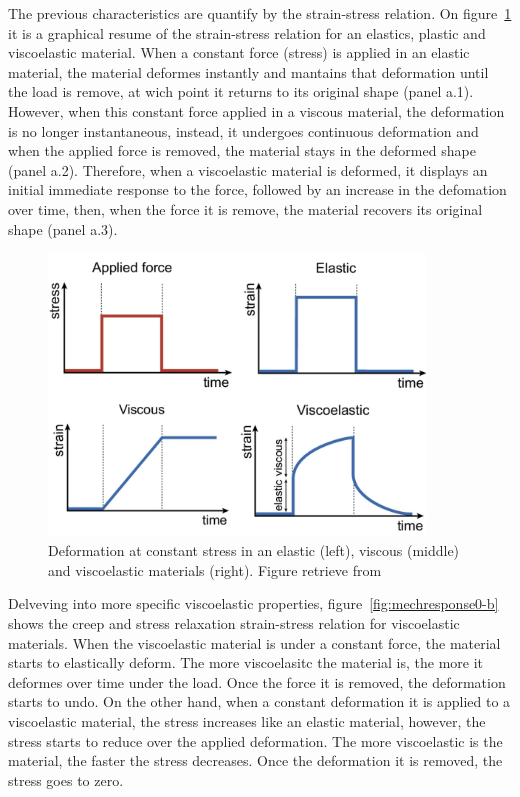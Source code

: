 The previous characteristics are quantify by the strain-stress relation.
On figure~\ref{fig:mechresponse0-a} it is a graphical resume of the strain-stress relation for an elastics, plastic and viscoelastic material.
When a constant force (stress) is applied in an elastic material, the material deformes instantly and mantains that deformation until the load is remove, at wich point it returns to its original shape (panel a.1).
However, when this constant force applied in a viscous material, the deformation is no longer instantaneous, instead, it undergoes continuous deformation and when the applied force is removed, the material stays in the deformed shape (panel a.2).
Therefore, when a viscoelastic material is deformed, it displays an initial immediate response to the force, followed by an increase in the defomation over time, then, when the force it is remove, the material recovers its original shape (panel a.3).

\begin{figure}[ht!]
    \centering
    \centering
    \includegraphics[width=10cm]{figs/mechResponse/viscoElasticResponse-1.png}
    \caption{Deformation at constant stress in an elastic (left), viscous (middle) and viscoelastic materials (right). Figure retrieve from\citep{courbotRoleExtracellularMatrix2025}}\label{fig:mechresponse0-a}
\end{figure}

Delveving into more specific viscoelastic properties, figure~\ref{fig:mechresponse0-b} shows the creep and stress relaxation strain-stress relation for viscoelastic materials.
When the viscoelastic material is under a constant force, the material starts to elastically deform.
The more viscoelasitc the material is, the more it deformes over time under the load.
Once the force it is removed, the deformation starts to undo.
On the other hand, when a constant deformation it is applied to a viscoelastic material, the stress increases like an elastic material, however, the stress starts to reduce over the applied deformation.
The more viscoelastic is the material, the faster the stress decreases. 
Once the deformation it is removed, the stress goes to zero.

